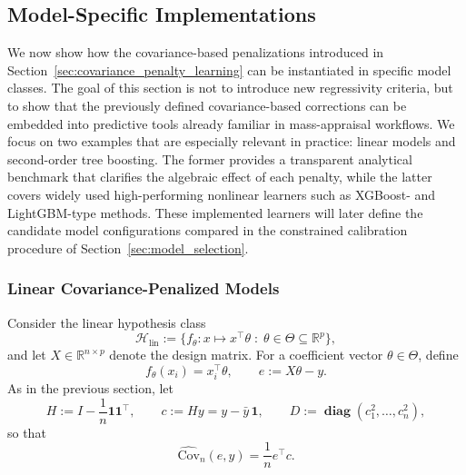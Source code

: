 \documentclass[12pt, draft]{article}
\theoremstyle{plain}
\theoremstyle{definition}
\newcommand{\R}{\mathbb{R}}
\newcommand{\1}{\mathbf{1}}
\newcommand{\Cov}{\text{Cov}}
\renewcommand{\H}{\mathcal{H}}
\renewcommand{\R}{\mathbb{R}}
\newcommand{\diag}{\mathbf{\operatorname{diag}}}
\begin{document}
{\subsection{Model-Specific Implementations}
\label{sec:model_specific_implementations}

We now show how the covariance-based penalizations introduced in Section~\ref{sec:covariance_penalty_learning} can be instantiated in specific model classes. The goal of this section is not to introduce new regressivity criteria, but to show that the previously defined covariance-based corrections can be embedded into predictive tools already familiar in mass-appraisal workflows. We focus on two examples that are especially relevant in practice: linear models and second-order tree boosting. The former provides a transparent analytical benchmark that clarifies the algebraic effect of each penalty, while the latter covers widely used high-performing nonlinear learners such as XGBoost- and LightGBM-type methods. These implemented learners will later define the candidate model configurations compared in the constrained calibration procedure of Section~\ref{sec:model_selection}.




\subsubsection{Linear Covariance-Penalized Models}
\label{subsec:linear_models}

Consider the linear hypothesis class
\[
\H_{\mathrm{lin}} := \{f_\theta : x \mapsto x^\top \theta \;:\; \theta \in \Theta \subseteq \R^p\},
\]
and let $X \in \R^{n\times p}$ denote the design matrix. For a coefficient vector $\theta \in \Theta$, define
\[
f_\theta(x_i) = x_i^\top \theta,
\qquad
e := X\theta - y.
\]
As in the previous section, let
\[
H := I - \frac{1}{n}\mathbf{1}\mathbf{1}^\top,
\qquad
c := Hy = y - \bar y\,\mathbf{1},
\qquad
D := \diag(c_1^2,\dots,c_n^2),
\]
so that
\[
\widehat{\Cov}_n(e,y)
=
\frac{1}{n}e^\top c.
\]

}
\end{document}
